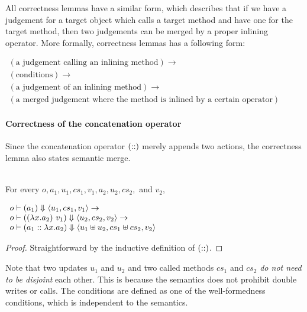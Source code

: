 All correctness lemmas have a similar form, which describes that if we
have a judgement for a target object which calls a target method and
have one for the target method, then two judgements can be merged by a
proper inlining operator. More formally, correctness lemmas has a
following form:
\begin{center}
  \begin{math}
    \begin{array}{l}
      (\textrm{a judgement calling an inlining method}) \to \\
      (\textrm{conditions}) \to \\
      (\textrm{a judgement of an inlining method}) \to \\
      (\textrm{a merged judgement where the method is inlined by a certain operator})
    \end{array}
  \end{math}
\end{center}

\paragraph{Correctness of the concatenation operator}

Since the concatenation operator $(::)$ merely appends two
actions, the correctness lemma also states semantic merge.

\begin{lemma}
  \label{lem-concatsymb}
  \mbox{}\\
  For every $o, a_1, u_1, cs_1, v_1, a_2, u_2, cs_2,$ and $v_2,$
  \begin{center}
    \begin{math}
      \begin{array}{l}
        o |- (a_1) \Downarrow \langle u_1, cs_1, v_1 \rangle \to \\
        o |- ((\lambda x.a_2)\ v_1) \Downarrow \langle u_2, cs_2, v_2 \rangle \to \\
        o |- (a_1 ::{} \lambda x.a_2) \Downarrow \langle u_1 \uplus u_2, cs_1 \uplus cs_2, v_2 \rangle
      \end{array}
    \end{math}
  \end{center}
\end{lemma}
\begin{proof}
  Straightforward by the inductive definition of $(::)$.
\end{proof}

Note that two updates $u_1$ and $u_2$ and two called methods $cs_1$
and $cs_2$ \emph{do not need to be disjoint} each other. This is
because the semantics does not prohibit double writes or calls. The
conditions are defined as one of the well-formedness conditions, which
is independent to the semantics.

